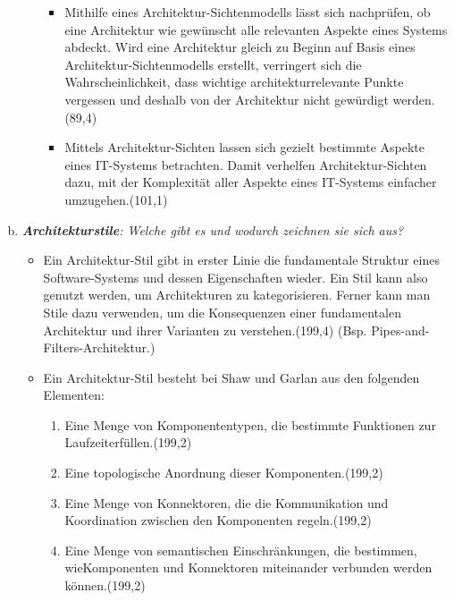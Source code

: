 \begin{enumerate}[(a)]
\begin{itemize}
\begin{itemize}
            \item Mithilfe eines Architektur-Sichtenmodells lässt sich nachprüfen, ob eine Architektur wie gewünscht alle relevanten Aspekte eines Systems abdeckt. Wird eine Architektur gleich zu Beginn auf Basis eines Architektur-Sichtenmodells erstellt, verringert sich die Wahrscheinlichkeit, dass wichtige architekturrelevante Punkte vergessen und deshalb von der Architektur nicht gewürdigt werden.(89,4)
            
            \item Mittels Architektur-Sichten lassen sich gezielt bestimmte Aspekte eines IT-Systems betrachten. Damit verhelfen Architektur-Sichten dazu, mit der Komplexität aller Aspekte eines IT-Systems einfacher umzugehen.(101,1)


        \end{itemize}
        
    \end{itemize}
   

    \item {\itshape \textbf{Architekturstile}: Welche gibt es und wodurch zeichnen sie sich aus?}
   \begin{itemize}
       \item Ein Architektur-Stil gibt in erster Linie die fundamentale Struktur eines Software-Systems und dessen Eigenschaften wieder. Ein Stil kann also genutzt werden, um Architekturen zu kategorisieren. Ferner kann man Stile dazu verwenden, um die Konsequenzen einer fundamentalen Architektur und ihrer Varianten zu verstehen.(199,4) (Bsp. Pipes-and-Filters-Architektur.)

        \item Ein Architektur-Stil besteht bei Shaw und Garlan aus den folgenden Elementen: 
        \begin{enumerate}[1.]
           \item Eine Menge von Komponententypen, die bestimmte Funktionen zur Laufzeiterfüllen.(199,2)
           \item Eine topologische Anordnung dieser Komponenten.(199,2)
           \item Eine Menge von Konnektoren, die die Kommunikation und Koordination zwischen den Komponenten regeln.(199,2)
           \item Eine Menge von semantischen Einschränkungen, die bestimmen, wieKomponenten und Konnektoren miteinander verbunden werden können.(199,2)
       \end{enumerate}
   \end{itemize}
    
\end{enumerate}


